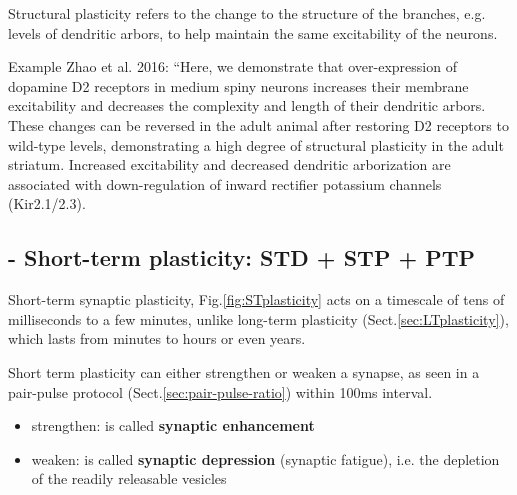 Structural plasticity refers to the change to the structure of the branches,
e.g. levels of dendritic arbors, to help maintain the same excitability of the
neurons.

Example Zhao et al. 2016: 
``Here, we demonstrate that over-expression of dopamine D2 receptors in medium
spiny neurons increases their membrane excitability and decreases the complexity
and length of their dendritic arbors. These changes can be reversed in the adult
animal after restoring D2 receptors to wild-type levels, demonstrating a high
degree of structural plasticity in the adult striatum. Increased excitability
and decreased dendritic arborization are associated with down-regulation of
inward rectifier potassium channels (Kir2.1/2.3).



\subsection{- Short-term plasticity: STD + STP + PTP}
\label{sec:STplasticity}
\label{sec:short-term_potentiation}
\label{sec:short-term_depression}
\label{sec:post-tetanic-potentiation}



Short-term synaptic plasticity, Fig.\ref{fig:STplasticity} acts on a timescale of tens of
milliseconds to a few minutes, unlike long-term plasticity
(Sect.\ref{sec:LTplasticity}), which lasts from minutes to hours or even years.

Short term plasticity can either strengthen or weaken a synapse, as seen in a
pair-pulse protocol (Sect.\ref{sec:pair-pulse-ratio}) within 100ms interval.
\begin{itemize}
  \item strengthen: is called {\bf synaptic enhancement}
  \item weaken: is called {\bf synaptic depression} (synaptic fatigue), i.e.
  the depletion of the readily releasable vesicles
\end{itemize}

